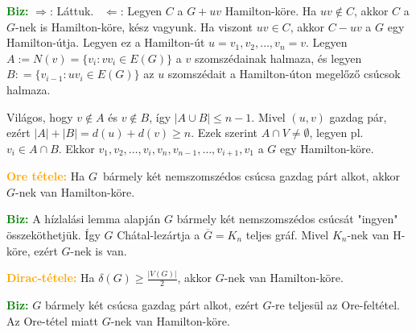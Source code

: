\documentclass[../../szobeli.tex]{subfiles}
\begin{document}
\begin{itemize}
        \textcolor{green}{\textbf{Biz:}} $\Rightarrow$: Láttuk. \checkmark $\Leftarrow$: Legyen $C$ a $G + uv$ Hamilton-köre. Ha $uv \notin C$, akkor $C$ a $G$-nek is Hamilton-köre, kész vagyunk. Ha viszont $uv \in C$, akkor $C-uv$ a $G$ egy Hamilton-útja. Legyen ez a Hamilton-út $u = v_1, v_2, \dots, v_n = v$. Legyen $A:=N(v) = \{v_i:vv_i \in E(G)\}$ a $v$ szomszédainak halmaza, és legyen $B: = \{v_{i-1} : uv_i \in E(G)\}$ az $u$ szomszédait a Hamilton-úton megelőző csúcsok halmaza.

        Világos, hogy $v \notin A$ és $v \notin B$, így $|A \cup B| \leq n-1$. Mivel $(u,v)$ gazdag pár, ezért $|A|+|B| = d(u)+d(v) \geq n$. Ezek szerint $A \cap V \neq \emptyset$, legyen pl. $v_i \in A \cap B$. Ekkor $v_1, v_2, \dots, v_i, v_n, v_{n-1}, \dots, v_{i+1}, v_1$ a $G$ egy Hamilton-köre. 

        \textcolor{orange}{\textbf{Ore tétele:}} Ha $G$ bármely két nemszomszédos csúcsa gazdag párt alkot, akkor $G$-nek van Hamilton-köre.

        \textcolor{green}{\textbf{Biz:}} A hízlalási lemma alapján $G$ bármely két nemszomszédos csúcsát "ingyen" összeköthetjük. Így $G$ Chátal-lezártja a $\overline{G} = K_n$ teljes gráf. Mivel $K_n$-nek van H-köre, ezért $G$-nek is van. 

        \textcolor{orange}{\textbf{Dirac-tétele:}} Ha $\delta(G) \geq \frac{|V(G)|}{2}$, akkor $G$-nek van Hamilton-köre.

        \textcolor{green}{\textbf{Biz:}} $G$ bármely két csúcsa gazdag párt alkot, ezért $G$-re teljesül az Ore-feltétel. Az Ore-tétel miatt $G$-nek van Hamilton-köre. 

    \end{itemize}
\end{document}
